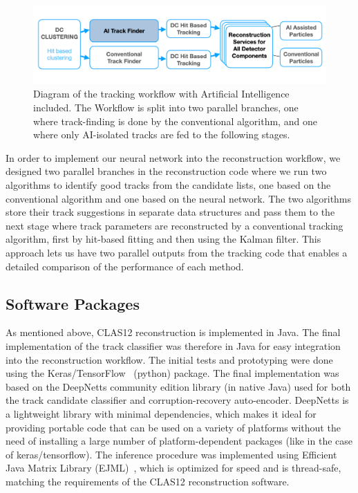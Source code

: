 \documentclass[aps,prl,preprint,12pt]{elsarticle}
\begin{document}
\begin{figure}[!ht]
\begin{center}
 \includegraphics[width=6.0in]{images/CLARA_AI_diagram.png}
\caption {Diagram of the tracking workflow with Artificial Intelligence included. The Workflow is split into 
two parallel branches, one where track-finding is done by the conventional algorithm, and one where only 
AI-isolated tracks are fed to the following stages.}
 \label{recon:diagram}
 \end{center}
\end{figure}

In order to implement our neural network into the reconstruction workflow, we designed two parallel 
branches in the reconstruction code where we run two algorithms to identify good tracks from the 
candidate lists, one based on the conventional algorithm and one based on the neural network. The two 
algorithms store their track suggestions in separate data structures and pass them to the next stage where 
track parameters are reconstructed by a conventional tracking algorithm, first by hit-based fitting and then 
using the Kalman filter. This approach lets us have two parallel outputs from the tracking code that enables 
a detailed comparison of the performance of each method.

\subsection{Software Packages}

As mentioned above, CLAS12 reconstruction is implemented in Java. The final implementation of the  
track classifier was therefore in Java for easy integration into the reconstruction workflow. The initial tests 
and prototyping were done using the Keras/TensorFlow~\cite{keras-website} (python) package. The final 
implementation was based on the DeepNetts \cite{Sevarac.Z} community edition library (in native Java) 
used for both the track candidate classifier and corruption-recovery auto-encoder. DeepNetts is a lightweight
 library with minimal dependencies, which makes it ideal for providing portable code that can be used on a variety 
 of platforms without the need of installing a large number of platform-dependent packages (like in the case of
  keras/tensorflow). The inference procedure was implemented using Efficient Java Matrix Library (EJML)~\cite{ejml:2021}, 
  which is optimized for speed and is thread-safe, matching the requirements of the CLAS12 reconstruction software.
\end{document}
